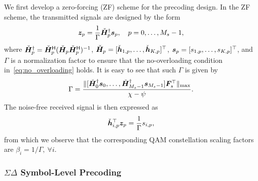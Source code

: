 \documentclass[10pt,twocolumn,twoside]{IEEEtran}
\begin{document}
We first develop a zero-forcing (ZF) scheme for the precoding design.
In the ZF scheme, the transmitted signals are designed by the form
\begin{equation}\label{eq:zf}
	{\bm z}_p =
	\frac{1}{\Gamma} \check {{\bm H}}_p^\dagger {\bm s}_p, \quad p=0,\dots,M_s-1,
\end{equation}
where
$\check {{\bm H}}_p^\dagger = \check {{\bm H}}_p^{\mathsf{H}} (\check {{\bm H}}_p \check {{\bm H}}_p^{\mathsf{H}})^{-1}$,
$\check {{\bm H}}_p = [\check {{\bm h}}_{1,p},\dots,\check {{\bm h}}_{K,p}]^\top$, ${\bm s}_p = [s_{1,p},\dots,s_{K,p}]^\top$, and $\Gamma$ is a normalization factor to ensure that the no-overloading condition in~\eqref{eq:no_overloading} holds.
It is easy to see that such $\Gamma$ is given by
\[
\Gamma = \frac{\| [\check{{\bm H}}_0^\dagger{\bm s}_0,\dots,\check{{\bm H}}_{M_s-1}^\dagger{\bm s}_{M_s-1}] {\bm F}_s^\top \|_{\rm max} }{\chi - \psi}.
\]
The noise-free received signal is then expressed as
\begin{equation*}
	\check {{\bm h}}_{i,p}^\top  {\bm z}_p = \frac{1}{\Gamma} s_{i,p},
\end{equation*}
from which we observe that the corresponding QAM constellation scaling factors are
$
\beta_i = {1}/{\Gamma},~ \forall i.
$





\subsubsection{$\Sigma \Delta$ Symbol-Level Precoding}
\end{document}
